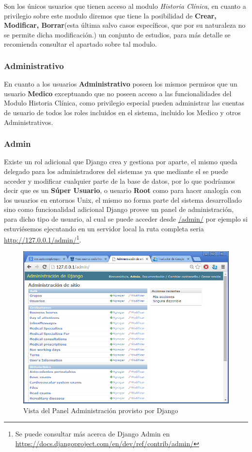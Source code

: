 Son los únicos usuarios que tienen acceso al modulo \textit{Historia Clínica}, en cuanto a privilegio sobre este modulo diremos que tiene la posibilidad de \textbf{Crear, Modificar, Borrar}(esta última salvo casos específicos, que por su naturaleza no se permite dicha modificación.) un conjunto de estudios, para más detalle se recomienda consultar el apartado sobre tal modulo.


\subsubsection{Administrativo}

En cuanto a los usuarios \textbf{Administrativo} poseen los mismos permisos que un usuario \textbf{Medico} exceptuando que no poseen acceso a las funcionalidades del Modulo Historia Clínica, como privilegio especial pueden administrar las cuentas de usuario de todos los roles incluidos en el sistema, incluido los 
Medico y otros Administrativos.

\subsubsection{Admin}

Existe un rol adicional que Django crea y gestiona por aparte, el mismo queda delegado para los administradores del sistemas ya que mediante el se puede acceder y modificar cualquier parte de la base de datos, por lo que podríamos decir que es un \textbf{Súper Usuario}, o usuario \textbf{Root} como para hacer analogía con los usuarios en entornos Unix, el mismo no forma parte del sistema desarrollado sino como funcionalidad adicional Django provee un panel de administración, para dicho tipo de usuario, al cual se puede acceder desde \url{/admin/} por ejemplo si estuviésemos ejecutando en un servidor local la ruta completa seria \url{http://127.0.0.1/admin/}\footnote{Se puede consultar más acerca de Django
Admin en \url{https://docs.djangoproject.com/en/dev/ref/contrib/admin/}}.\\[0.1cm]


\begin{figure}[h]
    \centering
    \includegraphics[scale=0.5]{resourse/django-admin.png}
    \caption{Vista del Panel Administración provisto por Django}
    \label{fig:123}
\end{figure}  


